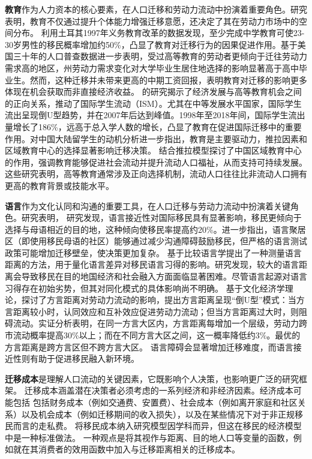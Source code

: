 \documentclass[a4paper,12pt,oneside, fontset=mac]{ctexbook} %
\begin{document}
\textbf{教育}作为人力资本的核心要素，在人口迁移和劳动力流动中扮演着重要角色。研究表明，教育不仅通过提升个体能力增强迁移意愿，还决定了其在劳动力市场中的空间分布。
\cite{aydemirEffectEducationInternal2022}利用土耳其1997年义务教育改革的数据发现，至少完成中学教育可使23-30岁男性的移民概率增加约50\%，凸显了教育对迁移行为的因果促进作用。\cite{wozniakAreCollegeGraduates2010}基于美国三十年的人口普查数据进一步表明，受过高等教育的劳动者更倾向于迁往劳动力需求高的地区，州劳动力需求变化对大学毕业生居住地选择的影响显著高于高中毕业生。然而，这种迁移并未带来更高的中期工资回报，表明教育对迁移的影响更多体现在机会获取而非直接经济收益。
\cite{weberStudentMigrationTransition2023}的研究揭示了经济发展与高等教育机会之间的正向关系，推动了国际学生流动（ISM）。尤其在中等发展水平国家，国际学生流出呈现倒U型趋势，并在2007年后达到峰值。1998年至2018年间，国际学生流出量增长了186\%，远高于总入学人数的增长，凸显了教育在促进国际迁移中的重要作用。\cite{jianiWhyHowInternational2017}对中国大陆留学生的动机分析进一步指出，教育是主要驱动力，推拉因素和区域教育中心的选择显著影响迁移决策。
\cite{wenEmergenceRegionalEducation2019}结合推拉模型探讨了中国区域教育中心的作用，强调教育能够促进社会流动并提升流动人口福祉，从而支持可持续发展。这些研究表明，高等教育通常涉及正向选择机制，流动人口往往比非流动人口拥有更高的教育背景或技能水平。

\textbf{语言}作为文化认同和沟通的重要工具，在人口迁移与劳动力流动中扮演着关键角色。研究表明，
\cite{adseraRoleLanguageShaping2015}研究发现，语言接近性对国际移民具有显著影响，移民更倾向于选择与母语相近的目的地，这种倾向使移民率提高约20\%。\cite{bauerEnclavesLanguageLocation2005}进一步指出，语言聚居区（即使用移民母语的社区）能够通过减少沟通障碍鼓励移民，但严格的语言测试政策可能增加迁移壁垒，使决策更加复杂。
\cite{isphordingLinguisticBarriersDestination2014}基于比较语言学提出了一种测量语言距离的方法，用于量化语言差异对移民语言习得的影响。研究发现，较大的语言距离会导致移民在目的地国经济和社会融入方面面临显著困难。尽管语言起源对语言习得存在初始劣势，但其对同化模式的具体影响尚不明确。
\cite{LiuYuYunLaoDongLiKuaFangYanLiuDongDeDaoUXingMoShi2015}基于文化经济学理论，探讨了方言距离对劳动力流动的影响，提出方言距离呈现“倒U型”模式：当方言距离较小时，认同效应和互补效应促进劳动力流动；但当方言距离过大时，则阻碍流动。实证分析表明，在同一方言大区内，方言距离每增加一个层级，劳动力跨市流动概率提高30\%以上；而在不同方言大区之间，这一概率降低约3\%。最优的方言距离是跨方言区但不跨方言大区。
语言障碍会显著增加迁移难度，而语言接近性则有助于促进移民融入新环境。

\textbf{迁移成本}是理解人口流动的关键因素，它既影响个人决策，也影响更广泛的研究框架。
迁移成本涵盖潜在决策者必须考虑的一系列经济和非经济因素。经济成本可能包括
包括财务成本（例如交通费、安置费）、社会成本（例如离开家庭和社区关系）以及机会成本（例如迁移期间的收入损失），以及在某些情况下对于非正规移民而言的走私费。
将移民成本纳入研究模型因学科而异，但这在移民的经济模型中是一种标准做法。 
一种观点是将其视作与距离、目的地人口等变量的函数，例如\cite{LiuChenHuiLaoDongLiLiuDongJiNengPiPeiYuDiQuJingJiChaiJu2022}就在其消费者的效用函数中加入与迁移距离相关的迁移成本。
\end{document}
